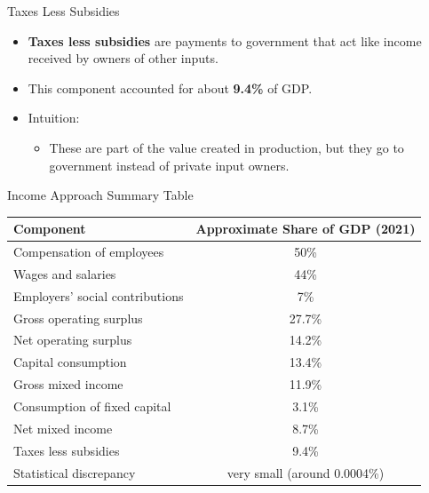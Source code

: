 \documentclass[aspectratio=169]{beamer}
\begin{document}
\begin{frame}{Taxes Less Subsidies}
\transfade
\begin{itemize}
  \item \textbf{Taxes less subsidies} are payments to government that act like income received by owners of other inputs.
  \item This component accounted for about \textbf{9.4\%} of GDP.
  \item Intuition:
  \begin{itemize}
    \item These are part of the value created in production, but they go to government instead of private input owners.
  \end{itemize}
\end{itemize}
\end{frame}

\begin{frame}{Income Approach Summary Table}
\transfade
\small
\begin{tabular}{l c}
\toprule
\textbf{Component} & \textbf{Approximate Share of GDP (2021)} \\
\midrule
Compensation of employees & 50\% \\
\quad Wages and salaries & 44\% \\
\quad Employers' social contributions & 7\% \\
Gross operating surplus & 27.7\% \\
\quad Net operating surplus & 14.2\% \\
\quad Capital consumption & 13.4\% \\
Gross mixed income & 11.9\% \\
\quad Consumption of fixed capital & 3.1\% \\
\quad Net mixed income & 8.7\% \\
Taxes less subsidies & 9.4\% \\
Statistical discrepancy & very small (around 0.0004\%) \\
\bottomrule
\end{tabular}
\end{frame}

\end{document}

